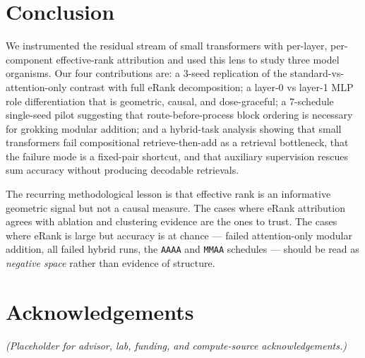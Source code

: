 \documentclass{article}
\begin{document}
\section{Conclusion}
\label{sec:conclusion}

We instrumented the residual stream of small transformers with per-layer, per-component effective-rank attribution and used this lens to study three model organisms. Our four contributions are: a 3-seed replication of the standard-vs-attention-only contrast with full eRank decomposition; a layer-0 vs layer-1 MLP role differentiation that is geometric, causal, and dose-graceful; a 7-schedule single-seed pilot suggesting that route-before-process block ordering is necessary for grokking modular addition; and a hybrid-task analysis showing that small transformers fail compositional retrieve-then-add as a retrieval bottleneck, that the failure mode is a fixed-pair shortcut, and that auxiliary supervision rescues sum accuracy without producing decodable retrievals.

The recurring methodological lesson is that effective rank is an informative geometric signal but not a causal measure. The cases where eRank attribution agrees with ablation and clustering evidence are the ones to trust. The cases where eRank is large but accuracy is at chance --- failed attention-only modular addition, all failed hybrid runs, the \texttt{AAAA} and \texttt{MMAA} schedules --- should be read as \emph{negative space} rather than evidence of structure.

\section*{Acknowledgements}

\textit{(Placeholder for advisor, lab, funding, and compute-source acknowledgements.)}
\end{document}
